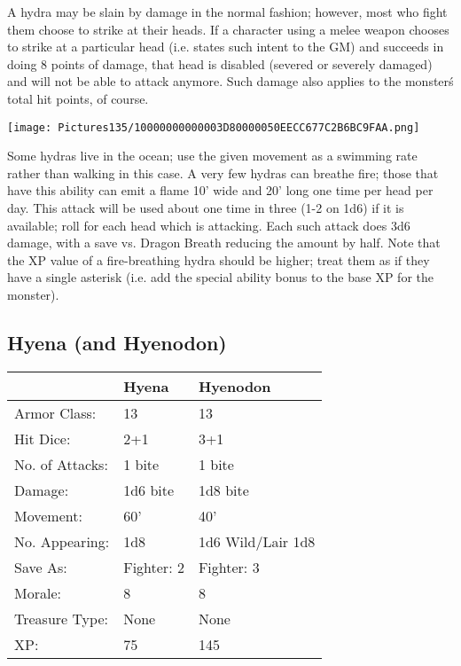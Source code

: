 \documentclass[a4paper,twoside,openany,10pt]{book}
\begin{document}
\begin{multicols}{2}
A hydra may be slain by damage in the normal fashion; however, most who fight them choose to strike at their heads. If a character using a melee weapon chooses to strike at a particular head (i.e. states such intent to the GM) and succeeds in doing 8 points of damage, that head is disabled (severed or severely damaged) and will not be able to attack anymore. Such damage also applies to the monster\'s total hit points, of course.

\begin{center}
	\texttt{[image: Pictures135/10000000000003D80000050EECC677C2B6BC9FAA.png]}
\end{center}

Some hydras live in the ocean; use the given movement as a swimming rate rather than walking in this case. A very few hydras can breathe fire; those that have this ability can emit a flame 10' wide and 20' long one time per head per day. This attack will be used about one time in three (1-2 on 1d6) if it is available; roll for each head which is attacking. Each such attack does 3d6 damage, with a save vs. Dragon Breath reducing the amount by half. Note that the XP value of a fire-breathing hydra should be higher; treat them as if they have a single asterisk (i.e. add the special ability bonus to the base XP for the monster).


\subsection*{Hyena (and Hyenodon)}\label{hyena-and-hyenodon}

\begin{tabularx}{0.50\textwidth}{@{}llX@{}}
& Hyena & Hyenodon \\\hline
Armor Class: & 13 & 13 \\\hline
Hit Dice: & 2+1 & 3+1 \\\hline
No. of Attacks: & 1 bite & 1 bite \\\hline
Damage: & 1d6 bite & 1d8 bite \\\hline
Movement: & 60' & 40' \\\hline
No. Appearing: & 1d8 & 1d6 Wild/Lair 1d8 \\\hline
Save As: & Fighter: 2 & Fighter: 3 \\\hline
Morale: & 8 & 8 \\\hline
Treasure Type: & None & None \\\hline
XP: & 75 & 145 \\\hline
\end{tabularx}\medskip


\end{multicols}
\end{document}
